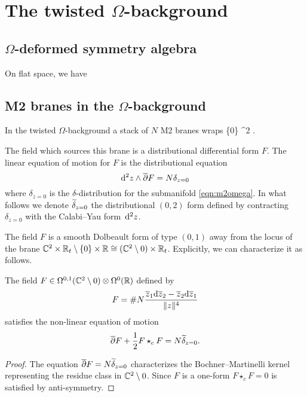 \documentclass[11pt]{amsart}
\begin{document}
\section{The twisted $\Omega$-background} 

\subsection{$\Omega$-deformed symmetry algebra}

On flat space, we have 



\subsection{M2 branes in the $\Omega$-background} 

\parsec[]

In the twisted $\Omega$-background a stack of $N$ M2 branes wraps 
\beqn\label{eqn:m2omega}
\{0\} \times \RR \subset \CC^2 \times \RR .
\eeqn

The field which sources this brane is a distributional differential form $F$.
The linear equation of motion for $F$ is the distributional equation 
\[
{\rm d}^2 z \wedge \overline{\partial} F = N \delta_{z=0} 
\]
where $\delta_{z=0}$ is the $\delta$-distribution for the submanifold \eqref{eqn:m2omega}.  
In what follows we denote $\widetilde{\delta}_{z=0}$ the distributional $(0,2)$ form defined by contracting $\delta_{z=0}$ with the Calabi--Yau form~${\rm d}^2 z$. 

The field $F$ is a smooth Dolbeault form of type $(0,1)$ away from the locus of the brane $\mathbb C^2 \times \mathbb R_t \setminus \{0\} \times \mathbb R \cong (\mathbb C^2 \setminus 0) \times \mathbb R_t$. 
Explicitly, we can characterize it as follows. 

\begin{prop}
The field $F \in \Omega^{0,1} (\mathbb C^2 \setminus 0) \otimes \Omega^{0} (\mathbb R) $ defined by 
\[
F = \# N \frac{\overline{z}_1 {\rm d} \overline{z}_2 - \overline{z}_2 {\rm d} \overline{z}_1}{\|z\|^4} 
\] 
satisfies the non-linear equation of motion 
\[
\overline{\partial} F + \frac12 F \star_c F = N  \widetilde{\delta}_{z=0} .
\]
\end{prop}
\begin{proof}
The equation $\overline{\partial} F = N  \widetilde{\delta}_{z=0}$ characterizes the Bochner--Martinelli kernel representing the residue class in $\mathbb C^2 \setminus 0$. 
Since $F$ is a one-form $F \star_c F = 0$ is satisfied by anti-symmetry. 
\end{proof}

\parsec[]
\end{document}
